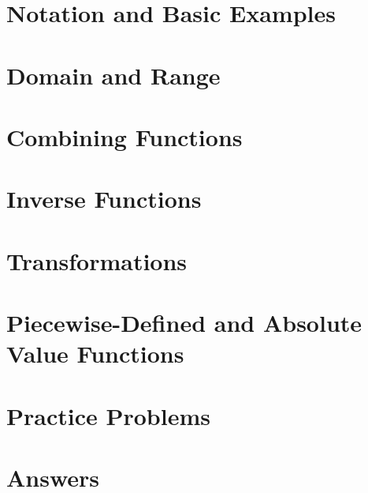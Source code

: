 \section{Notation and Basic Examples}

\newpage


\newpage

\section{Domain and Range}

\newpage


\newpage


\newpage

\section{Combining Functions}

\newpage


\newpage

\section{Inverse Functions}

\newpage

\section{Transformations}

\newpage

\section{Piecewise-Defined and Absolute Value Functions}

\newpage


\newpage

\section{Practice Problems}

\newpage


\section{Answers}

\newpage
\closegraphsfile